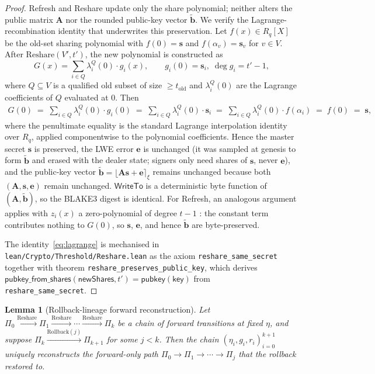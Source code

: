 \documentclass[11pt]{article}
\newtheorem{lemma}[theorem]{Lemma}
\begin{document}
\begin{proof}
Refresh and Reshare update only the share polynomial; neither alters
the public matrix $\mathbf{A}$ nor the rounded public-key vector
$\tilde{\mathbf{b}}$. We verify the Lagrange-recombination identity
that underwrites this preservation. Let $f(x) \in R_q[X]$ be the
old-set sharing polynomial with $f(0) = \mathbf{s}$ and
$f(\alpha_v) = \mathbf{s}_v$ for $v \in V$. After
$\mathrm{Reshare}(V', t')$, the new polynomial is constructed as
\[
  G(x) = \sum_{i \in Q} \lambda^Q_i(0) \cdot g_i(x),
  \qquad g_i(0) = \mathbf{s}_i,\; \deg g_i = t' - 1,
\]
where $Q \subseteq V$ is a qualified old subset of size
$\geq t_{\mathrm{old}}$ and $\lambda^Q_i(0)$ are the Lagrange
coefficients of $Q$ evaluated at $0$. Then
\begin{align}
  G(0) \;=\; \sum_{i \in Q} \lambda^Q_i(0) \cdot g_i(0)
       \;=\; \sum_{i \in Q} \lambda^Q_i(0) \cdot \mathbf{s}_i
       \;=\; \sum_{i \in Q} \lambda^Q_i(0) \cdot f(\alpha_i)
       \;=\; f(0)
       \;=\; \mathbf{s}, \label{eq:lagrange}
\end{align}
where the penultimate equality is the standard Lagrange interpolation
identity over $R_q$, applied componentwise to the polynomial
coefficients. Hence the master secret $\mathbf{s}$ is preserved, the
LWE error $\mathbf{e}$ is unchanged (it was sampled at genesis to form
$\tilde{\mathbf{b}}$ and erased with the dealer state; signers only
need shares of $\mathbf{s}$, never $\mathbf{e}$), and the public-key
vector $\tilde{\mathbf{b}} = \lfloor \mathbf{A} \mathbf{s} +
\mathbf{e} \rceil_\xi$ remains unchanged because both
$(\mathbf{A}, \mathbf{s}, \mathbf{e})$ remain unchanged.
$\mathsf{WriteTo}$ is a deterministic byte function of
$(\mathbf{A}, \tilde{\mathbf{b}})$, so the BLAKE3 digest is identical.
For Refresh, an analogous argument applies with $z_i(x)$ a
zero-polynomial of degree $t-1$ \cite{hjky97}: the constant term
contributes nothing to $G(0)$, so $\mathbf{s}$, $\mathbf{e}$, and
hence $\tilde{\mathbf{b}}$ are byte-preserved.

The identity~\eqref{eq:lagrange} is mechanised in
\texttt{lean/Crypto/Threshold/Reshare.lean} as the axiom
\texttt{reshare\_same\_secret} together with theorem
\texttt{reshare\_preserves\_public\_key}, which derives
$\mathsf{pubkey\_from\_shares}(\mathsf{newShares}, t')
= \mathsf{pubkey}(\mathsf{key})$ from \texttt{reshare\_same\_secret}.
\end{proof}

\begin{lemma}[Rollback-lineage forward reconstruction]
\label{lem:rollback-lineage}
Let
$\Pi_0 \xrightarrow{\mathrm{Reshare}} \Pi_1 \xrightarrow{\mathrm{Reshare}}
\cdots \xrightarrow{\mathrm{Reshare}} \Pi_k$ be a chain of forward
transitions at fixed $\eta$, and suppose
$\Pi_k \xrightarrow{\mathrm{Rollback}(j)} \Pi_{k+1}$ for some $j < k$.
Then the chain
$(\eta_i, g_i, r_i)_{i=0}^{k+1}$ uniquely reconstructs the
forward-only path $\Pi_0 \to \Pi_1 \to \cdots \to \Pi_j$ that the
rollback restored to.
\end{lemma}
\end{document}
